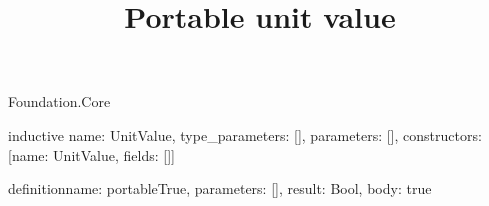 \begin{lexlean}{Foundation.Core}
\title{Portable unit value}
\begin{semanticmodule}
inductive{
  name: UnitValue,
  type_parameters: [],
  parameters: [],
  constructors: [{name: UnitValue, fields: []}]
}

definition{name: portableTrue, parameters: [], result: Bool, body: true}
\end{semanticmodule}
\end{lexlean}
